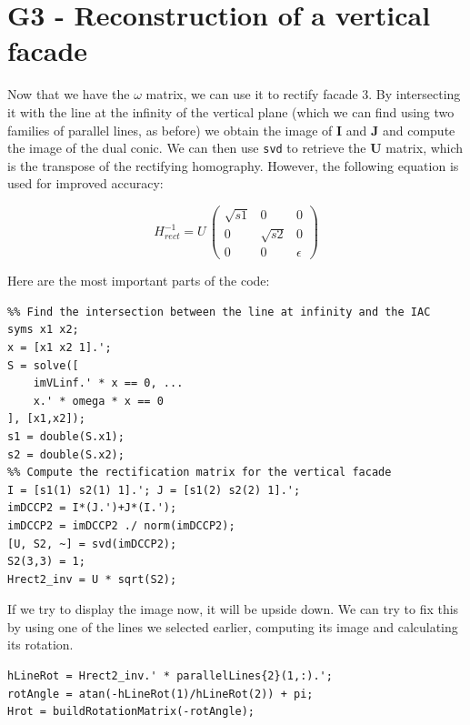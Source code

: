 \documentclass{Configuration_Files/PoliMi3i_thesis}
\begin{document}
\chapter{G3 - Reconstruction of a vertical facade}

Now that we have the $\omega$ matrix, we can use it to rectify facade 3. By intersecting it with the line at the infinity of the vertical plane (which we can find using two families of parallel lines, as before) we obtain the image of $\mathbf{I}$ and $\mathbf{J}$ and compute the image of the dual conic. We can then use \verb|svd| to retrieve the $\mathbf{U}$ matrix, which is the transpose of the rectifying homography. However, the following equation is used for improved accuracy:

\[
H_{rect}^{-1} = U\,\begin{pmatrix}
\sqrt{s1} & 0 & 0\\
0 & \sqrt{s2} & 0\\
0 & 0 & \epsilon
\end{pmatrix}
\]

Here are the most important parts of the code:

\begin{verbatim}
%% Find the intersection between the line at infinity and the IAC
syms x1 x2;
x = [x1 x2 1].';
S = solve([
    imVLinf.' * x == 0, ...
    x.' * omega * x == 0
], [x1,x2]);
s1 = double(S.x1);
s2 = double(S.x2);
%% Compute the rectification matrix for the vertical facade
I = [s1(1) s2(1) 1].'; J = [s1(2) s2(2) 1].';
imDCCP2 = I*(J.')+J*(I.');
imDCCP2 = imDCCP2 ./ norm(imDCCP2);
[U, S2, ~] = svd(imDCCP2);
S2(3,3) = 1;
Hrect2_inv = U * sqrt(S2);
\end{verbatim}

If we try to display the image now, it will be upside down. We can try to fix this by using one of the lines we selected earlier, computing its image and calculating its rotation.

\begin{verbatim}
hLineRot = Hrect2_inv.' * parallelLines{2}(1,:).';
rotAngle = atan(-hLineRot(1)/hLineRot(2)) + pi;
Hrot = buildRotationMatrix(-rotAngle);
\end{verbatim}
\end{document}
